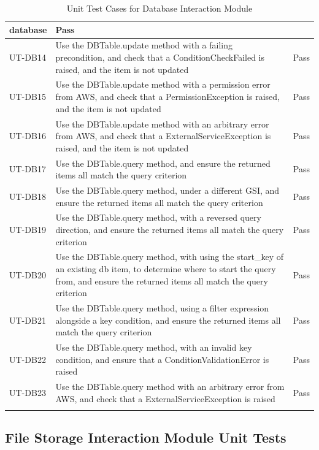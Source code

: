 \documentclass[12pt, titlepage]{article}
\begin{document}
\begin{longtable}{|m{2cm}|m{10cm}|m{1.4cm}|}
  database & Pass\\ \hline
  UT-DB14 & Use the DBTable.update method with a failing
  precondition, and check that a ConditionCheckFailed is raised, and
  the item is not updated & Pass\\ \hline
  UT-DB15 & Use the DBTable.update method with a permission error
  from AWS, and check that a PermissionException is raised, and the
  item is not updated & Pass\\ \hline
  UT-DB16 & Use the DBTable.update method with an arbitrary error
  from AWS, and check that a ExternalServiceException is raised, and
  the item is not updated & Pass\\ \hline
  UT-DB17 & Use the DBTable.query method, and ensure the returned
  items all match the query criterion & Pass\\ \hline
  UT-DB18 & Use the DBTable.query method, under a different GSI, and
  ensure the returned items all match the query criterion & Pass\\ \hline
  UT-DB19 & Use the DBTable.query method, with a reversed query
  direction, and ensure the returned items all match the query
  criterion & Pass\\ \hline
  UT-DB20 & Use the DBTable.query method, with using the start\_key
  of an existing db item, to determine where to start the query from,
  and ensure the returned items all match the query criterion & Pass\\ \hline
  UT-DB21 & Use the DBTable.query method, using a filter expression
  alongside a key condition, and ensure the returned items all match
  the query criterion & Pass\\ \hline
  UT-DB22 & Use the DBTable.query method, with an invalid key
  condition, and ensure that a ConditionValidationError is raised &
  Pass\\ \hline
  UT-DB23 & Use the DBTable.query method with an arbitrary error
  from AWS, and check that a ExternalServiceException is raised & Pass\\ \hline
  \caption{Unit Test Cases for Database Interaction Module}
\end{longtable}

\subsection{File Storage Interaction Module Unit Tests}
\end{document}
